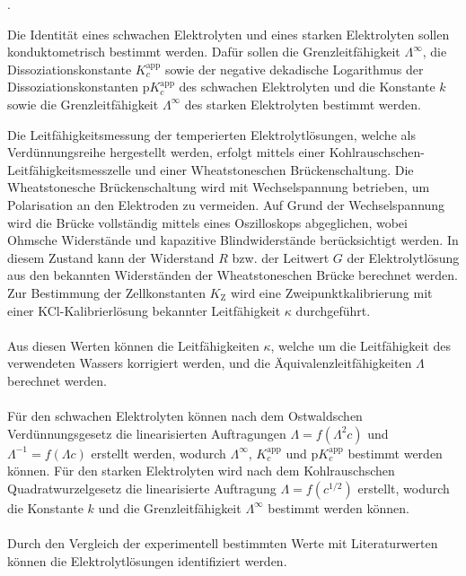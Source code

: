 \documentclass[a4paper,12pt]{article}
\begin{document}

\color{white}
.\newline

\vspace{5.5cm}

\color{blue}
Die Identität eines schwachen Elektrolyten und eines starken Elektrolyten sollen konduktometrisch bestimmt werden. Dafür sollen die Grenzleitfähigkeit $\Lambda^\infty$, die Dissoziationskonstante $K_c^{\text{app}}$ sowie der negative dekadische Logarithmus der Dissoziationskonstanten $\text{p}K_c^{\text{app}}$ des schwachen Elektrolyten und die Konstante $k$ sowie die Grenzleitfähigkeit $\Lambda^\infty$ des starken Elektrolyten bestimmt werden.

\vspace{3.5cm}

Die Leitfähigkeitsmessung der temperierten Elektrolytlösungen, welche als Verdünnungsreihe hergestellt werden, erfolgt mittels einer Kohlrauschschen-Leitfähigkeitsmesszelle und einer Wheatstoneschen Brückenschaltung. Die Wheatstonesche Brückenschaltung wird mit Wechselspannung betrieben, um Polarisation an den Elektroden zu vermeiden. Auf Grund der Wechselspannung wird die Brücke vollständig mittels eines Oszilloskops abgeglichen, wobei Ohmsche Widerstände und kapazitive Blindwiderstände berücksichtigt werden. In diesem Zustand kann der Widerstand $R$ bzw. der Leitwert $G$ der Elektrolytlösung aus den bekannten Widerständen der Wheatstoneschen Brücke berechnet werden.\\
Zur Bestimmung der Zellkonstanten $K_\mathrm{Z}$ wird eine Zweipunktkalibrierung mit einer KCl-Kalibrierlösung bekannter Leitfähigkeit $\kappa$ durchgeführt.\\ \\
Aus diesen Werten können die Leitfähigkeiten $\kappa$, welche um die Leitfähigkeit des verwendeten Wassers korrigiert werden, und die Äquivalenzleitfähigkeiten $\Lambda$ berechnet werden.\\ \\
Für den schwachen Elektrolyten können nach dem Ostwaldschen Verdünnungsgesetz die linearisierten Auftragungen $\Lambda=f(\Lambda^2c)$ und $\Lambda^{-1}=f(\Lambda c)$ erstellt werden, wodurch $\Lambda^\infty$, $K_c^{\text{app}}$ und $\text{p}K_c^{\text{app}}$ bestimmt werden können. Für den starken Elektrolyten wird nach dem Kohlrauschschen Quadratwurzelgesetz die linearisierte Auftragung $\Lambda=f(c^{1/2})$ erstellt, wodurch die Konstante $k$ und die Grenzleitfähigkeit $\Lambda^\infty$ bestimmt werden können.\\ \\
Durch den Vergleich der experimentell bestimmten Werte mit Literaturwerten können die Elektrolytlösungen identifiziert werden.
    
\end{document}
